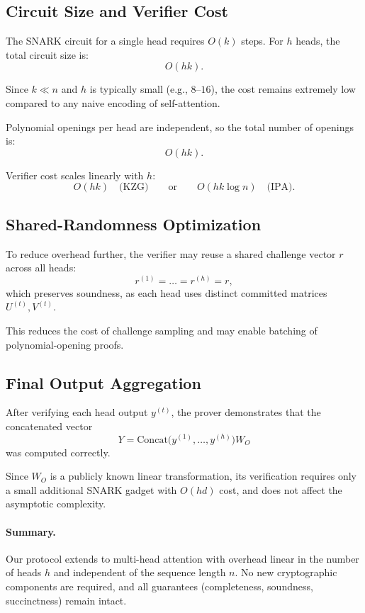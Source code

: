\documentclass[11pt]{article}
\begin{document}
\subsection{Circuit Size and Verifier Cost}

The SNARK circuit for a single head requires $O(k)$ steps.
For $h$ heads, the total circuit size is:
\[
  O(hk).
\]

Since $k \ll n$ and $h$ is typically small (e.g., $8$--$16$), the cost
remains extremely low compared to any naive encoding of self-attention.

Polynomial openings per head are independent, so the total number of
openings is:
\[
  O(hk).
\]

Verifier cost scales linearly with $h$:
\[
  O(hk) \quad \text{(KZG)} 
  \qquad\text{or}\qquad 
  O(hk \log n) \quad \text{(IPA)}.
\]

\subsection{Shared-Randomness Optimization}

To reduce overhead further, the verifier may reuse a shared challenge
vector $r$ across all heads:
\[
  r^{(1)} = \dots = r^{(h)} = r,
\]
which preserves soundness, as each head uses distinct committed matrices
$U^{(t)}, V^{(t)}$.

This reduces the cost of challenge sampling and may enable batching of
polynomial-opening proofs.

\subsection{Final Output Aggregation}

After verifying each head output $y^{(t)}$, the prover demonstrates that
the concatenated vector
\[
  Y = \mathrm{Concat}\big( y^{(1)}, \dots, y^{(h)} \big) W_O
\]
was computed correctly.

Since $W_O$ is a publicly known linear transformation, its verification
requires only a small additional SNARK gadget with $O(hd)$ cost, and
does not affect the asymptotic complexity.

\paragraph{Summary.}
Our protocol extends to multi-head attention with overhead linear in the
number of heads $h$ and independent of the sequence length $n$.
No new cryptographic components are required, and all guarantees
(completeness, soundness, succinctness) remain intact.
\end{document}
